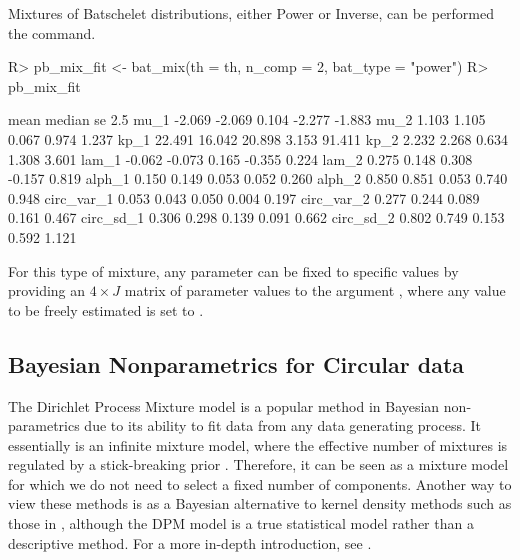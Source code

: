 Mixtures of Batschelet distributions, either Power or Inverse, can be
performed the  command.

\begin{CodeChunk}

\begin{CodeInput}
R> pb_mix_fit <- bat_mix(th = th, n_comp = 2, bat_type = "power")
R> pb_mix_fit
\end{CodeInput}

\begin{CodeOutput}
             mean median     se   2.5%
mu_1       -2.069 -2.069  0.104 -2.277 -1.883
mu_2        1.103  1.105  0.067  0.974  1.237
kp_1       22.491 16.042 20.898  3.153 91.411
kp_2        2.232  2.268  0.634  1.308  3.601
lam_1      -0.062 -0.073  0.165 -0.355  0.224
lam_2       0.275  0.148  0.308 -0.157  0.819
alph_1      0.150  0.149  0.053  0.052  0.260
alph_2      0.850  0.851  0.053  0.740  0.948
circ_var_1  0.053  0.043  0.050  0.004  0.197
circ_var_2  0.277  0.244  0.089  0.161  0.467
circ_sd_1   0.306  0.298  0.139  0.091  0.662
circ_sd_2   0.802  0.749  0.153  0.592  1.121
\end{CodeOutput}
\end{CodeChunk}

For this type of mixture, any parameter can be fixed to specific values
by providing an \(4 \times J\) matrix of parameter values to the
argument , where any value to be freely estimated is
set to .

\hypertarget{bayesian-nonparametrics-for-circular-data}{%
\subsection{Bayesian Nonparametrics for Circular
data}\label{bayesian-nonparametrics-for-circular-data}}

\label{sec:dpmjss}

The Dirichlet Process Mixture model is a popular method in Bayesian
non-parametrics due to its ability to fit data from any data generating
process. It essentially is an infinite mixture model, where the
effective number of mixtures is regulated by a stick-breaking prior
\citep{ishwaran2001gibbs}. Therefore, it can be seen as a mixture model
for which we do not need to select a fixed number of components. Another
way to view these methods is as a Bayesian alternative to kernel density
methods such as those in  \citep{JSSv061i09}, although the
DPM model is a true statistical model rather than a descriptive method.
For a more in-depth introduction, see
\citet[ch. 23]{gelman2003bayesian}.

